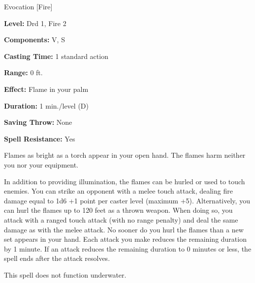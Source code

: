 
Evocation [Fire]

\textbf{Level:} Drd 1, Fire 2

\textbf{Components:} V, S

\textbf{Casting Time:} 1 standard action

\textbf{Range:} 0 ft.

\textbf{Effect:} Flame in your palm

\textbf{Duration:} 1 min./level (D)

\textbf{Saving Throw:} None

\textbf{Spell Resistance:} Yes

Flames as bright as a torch appear in your open hand. The flames harm neither you 
nor your equipment.

In addition to providing illumination, the flames can be hurled or used to touch 
enemies. You can strike an opponent with a melee touch attack, dealing fire damage 
equal to 1d6 +1 point per caster level (maximum +5). Alternatively, you can hurl 
the flames up to 120 feet as a thrown weapon. When doing so, you attack with a 
ranged touch attack (with no range penalty) and deal the same damage as with the 
melee attack. No sooner do you hurl the flames than a new set appears in your hand. 
Each attack you make reduces the remaining duration by 1 minute. If an attack reduces 
the remaining duration to 0 minutes or less, the spell ends after the attack resolves.

This spell does not function underwater.

